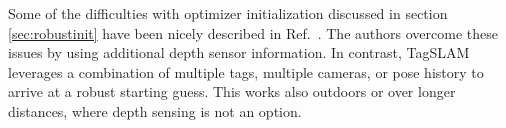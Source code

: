 Some of the difficulties with optimizer initialization discussed in
section \ref{sec:robustinit} have been nicely described in
Ref.\ \cite{jin2017}. The authors overcome these issues by using
additional depth sensor information. In contrast, TagSLAM leverages a
combination of multiple tags, multiple cameras, or pose history to
arrive at a robust starting guess. This works also outdoors or over
longer distances, where depth sensing is not an option.
